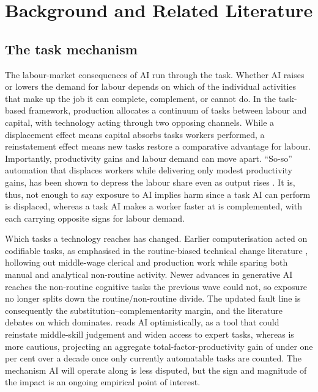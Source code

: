 \section{Background and Related Literature}\label{sec:background}

\subsection*{The task mechanism}

The labour-market consequences of AI run through the task. Whether AI raises or lowers the demand for labour depends on which of the individual activities that make up the job it can complete, complement, or cannot do. In the \citet{acemoglu2019} task-based framework, production allocates a continuum of tasks between labour and capital, with technology acting through two opposing channels. While a displacement effect means capital absorbs tasks workers performed, a reinstatement effect means new tasks restore a comparative advantage for labour. Importantly, productivity gains and labour demand can move apart. ``So-so'' automation that displaces workers while delivering only modest productivity gains, has been shown to depress the labour share even as output rises \citep{acemoglu2020}. 
It is, thus, not enough to say exposure to AI implies harm since a task AI can perform is displaced, whereas a task AI makes a worker faster at is complemented, with each carrying opposite signs for labour demand.


Which tasks a technology reaches has changed. Earlier computerisation acted on codifiable tasks, as emphasised in the routine-biased technical change literature \citep{autor2003, goos2007, autor2013}, hollowing out middle-wage clerical and production work while sparing both manual and analytical non-routine activity. Newer advances in generative AI reaches the non-routine cognitive tasks the previous wave could not, so exposure no longer splits down the routine/non-routine divide. The updated fault line is consequently the substitution--complementarity margin, and the literature debates on which dominates. \citet{autor2024} reads AI optimistically, as a tool that could reinstate middle-skill judgement and widen access to expert tasks, whereas \citet{acemoglu2025} is more cautious, projecting an aggregate total-factor-productivity gain of under one per cent over a decade once only currently automatable tasks are counted. The mechanism AI will operate along is less disputed, but the sign and magnitude of the impact is an ongoing empirical point of interest.


